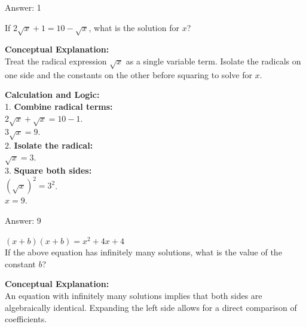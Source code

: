\documentclass[11pt,paper=a4,answers]{exam}
\begin{document}
\begin{questions}
\begin{solution}
\vspace{30pt}

Answer: \colorbox{yellow!100}{1}
\end{solution}

\vspace{60pt}

\question
If $2\sqrt{x} + 1 = 10 - \sqrt{x}$, what is the solution for $x$?

\begin{solution}
\textbf{Conceptual Explanation:} \\
Treat the radical expression $\sqrt{x}$ as a single variable term. Isolate the radicals on one side and the constants on the other before squaring to solve for $x$.

\vspace{30pt}

\textbf{Calculation and Logic:} \\
1. \textbf{Combine radical terms:} \\
$2\sqrt{x} + \sqrt{x} = 10 - 1$. \\
$3\sqrt{x} = 9$. \\
2. \textbf{Isolate the radical:} \\
$\sqrt{x} = 3$. \\
3. \textbf{Square both sides:} \\
$(\sqrt{x})^2 = 3^2$. \\
$x = 9$.

\vspace{30pt}

Answer: \colorbox{yellow!100}{9}
\end{solution}

\vspace{60pt}

\question
$(x+b)(x+b) = x^2 + 4x + 4$ \\
If the above equation has infinitely many solutions, what is the value of the constant $b$?

\begin{solution}
\textbf{Conceptual Explanation:} \\
An equation with infinitely many solutions implies that both sides are algebraically identical. Expanding the left side allows for a direct comparison of coefficients.

\vspace{30pt}


\end{solution}
\end{questions}
\end{document}
